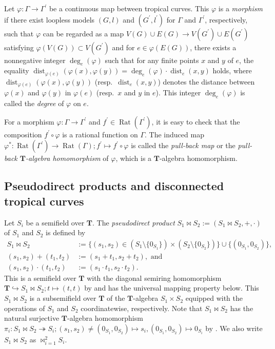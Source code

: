 \documentclass[a4paper,12pt]{amsart}
\def\Gamma{\varGamma}
\begin{document}
Let $\varphi : \Gamma \to \Gamma^{\prime}$ be a continuous map between tropical curves.
This $\varphi$ is a \textit{morphism} if there exist loopless models $(G, l)$ and $(G^{\prime}, l^{\prime})$ for $\Gamma$ and $\Gamma^{\prime}$, respectively, such that $\varphi$ can be regarded as a map $V(G) \cup E(G) \to V(G^{\prime}) \cup E(G^{\prime})$ satisfying $\varphi(V(G)) \subset V(G^{\prime})$ and for $e \in \varphi(E(G))$, there exists a nonnegative integer $\operatorname{deg}_e(\varphi)$ such that for any finite points $x$ and $y$ of $e$, the equality $\operatorname{dist}_{\varphi(e)}(\varphi (x), \varphi (y)) = \operatorname{deg}_e(\varphi) \cdot \operatorname{dist}_e(x, y)$ holds, where $\operatorname{dist}_{\varphi(e)}(\varphi(x), \varphi(y))$ (resp.~$\operatorname{dist}_{e}(x, y)$) denotes the distance between $\varphi(x)$ and $\varphi(y)$ in $\varphi(e)$ (resp.~$x$ and $y$ in $e$).
This integer $\operatorname{deg}_e(\varphi)$ is called the \textit{degree} of $\varphi$ on $e$.

For a morphism $\varphi : \Gamma \to \Gamma^{\prime}$ and $f^{\prime} \in \operatorname{Rat}(\Gamma^{\prime})$, it is easy to check that the composition $f^{\prime} \circ \varphi$ is a rational function on $\Gamma$.
The induced map $\varphi^{\ast} : \operatorname{Rat}(\Gamma^{\prime}) \to \operatorname{Rat}(\Gamma); f^{\prime} \mapsto f^{\prime} \circ \varphi$ is called the \textit{pull-back map} or the \textit{pull-back $\boldsymbol{T}$-algebra homomorphism} of $\varphi$, which is a $\boldsymbol{T}$-algebra homomorphism.

\subsection{Pseudodirect products and disconnected tropical curves}
    \label{subsection2.8}

Let $S_i$ be a semifield over $\boldsymbol{T}$.
The \textit{pseudodirect product} $S_1 \bowtie S_2 := (S_1 \bowtie S_2, +, \cdot)$ of $S_1$ and $S_2$ is defined by
\begin{align*}
S_1 \bowtie S_2 &:= \{ (s_1, s_2) \in (S_1 \setminus \{ 0_{S_1} \}) \times (S_2 \setminus \{ 0_{S_2} \}) \} \cup \{ (0_{S_1}, 0_{S_2}) \},\\
(s_1, s_2) + (t_1, t_2) &:= (s_1 + t_1, s_2 + t_2), \text{ and}\\
(s_1, s_2) \cdot (t_1, t_2) &:= (s_1 \cdot t_1, s_2 \cdot t_2).
\end{align*}
This is a semifield over $\boldsymbol{T}$ with the diagonal semiring homomorphism $\boldsymbol{T} \hookrightarrow S_1 \bowtie S_2; t \mapsto (t, t)$ by \cite[Lemma~3.32]{JuAe=Nakajima} and has the universal mapping property below.
This $S_1 \bowtie S_2$ is a subsemifield over $\boldsymbol{T}$ of the $\boldsymbol{T}$-algebra $S_1 \times S_2$ equipped with the operations of $S_1$ and $S_2$ coordinatewise, respectively.
Note that $S_1 \bowtie S_2$ has the natural surjective $\boldsymbol{T}$-algebra homomorphism $\pi_i : S_1 \bowtie S_2 \twoheadrightarrow S_i; (s_1, s_2) \not= (0_{S_1}, 0_{S_2}) \mapsto s_i, (0_{S_1}, 0_{S_2}) \mapsto 0_{S_i}$ by \cite[Lemma~3.33]{JuAe=Nakajima}.
We also write $S_1 \bowtie S_2$ as $\bowtie_{i = 1}^2 S_i$.
\end{document}
